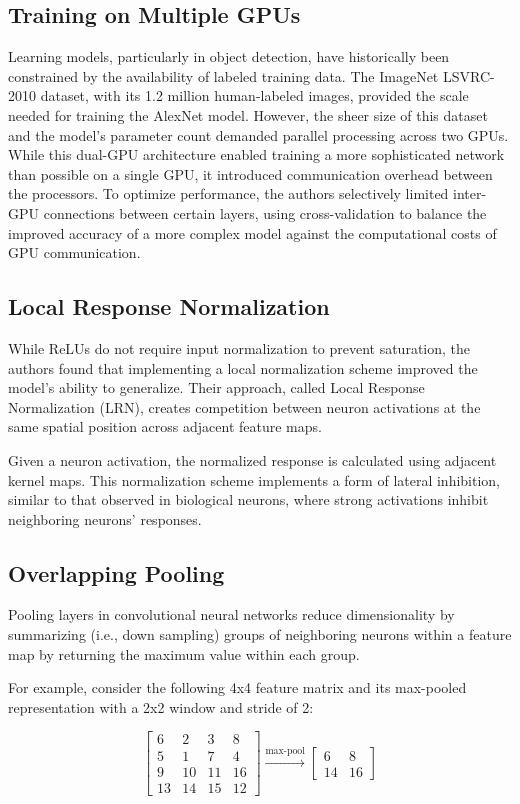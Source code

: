 \documentclass[10pt]{article}
\begin{document}
\subsection*{Training on Multiple GPUs}
Learning models, particularly in object detection, have historically been constrained by the availability of labeled training data. The ImageNet LSVRC-2010 dataset, with its 1.2 million human-labeled images, provided the scale needed for training the AlexNet model. However, the sheer size of this dataset and the model's parameter count demanded parallel processing across two GPUs. While this dual-GPU architecture enabled training a more sophisticated network than possible on a single GPU, it introduced communication overhead between the processors. To optimize performance, the authors selectively limited inter-GPU connections between certain layers, using cross-validation to balance the improved accuracy of a more complex model against the computational costs of GPU communication.


\subsection*{Local Response Normalization}
While ReLUs do not require input normalization to prevent saturation, the authors found that implementing a local normalization scheme improved the model's ability to generalize. Their approach, called Local Response Normalization (LRN), creates competition between neuron activations at the same spatial position across adjacent feature maps.

Given a neuron activation, the normalized response is calculated using adjacent kernel maps. This normalization scheme implements a form of lateral inhibition, similar to that observed in biological neurons, where strong activations inhibit neighboring neurons' responses.


\subsection*{Overlapping Pooling}

Pooling layers in convolutional neural networks reduce dimensionality by summarizing (i.e., down sampling) groups of neighboring neurons within a feature map by returning the maximum value within each group.

For example, consider the following 4x4 feature matrix and its max-pooled representation with a 2x2 window and stride of 2:

\begin{equation*}
    \begin{bmatrix}
        6  & 2  & 3  & 8  \\
        5  & 1  & 7  & 4  \\
        9  & 10 & 11 & 16 \\
        13 & 14 & 15 & 12
    \end{bmatrix}
    \xrightarrow{\text{max-pool}}
    \begin{bmatrix}
        6  & 8  \\
        14 & 16
    \end{bmatrix}
\end{equation*}
\end{document}
